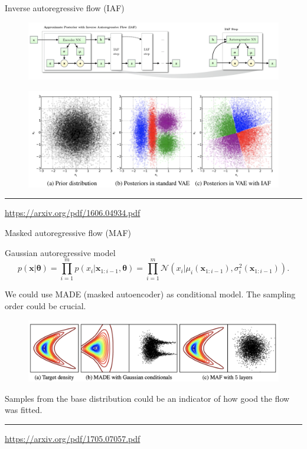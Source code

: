 \documentclass{beamer}
\newcommand{\bx}{\mathbf{x}}
\newcommand{\btheta}{\boldsymbol{\theta}}
\begin{document}
\begin{frame}{Inverse autoregressive flow (IAF)}
	\begin{figure}
		\includegraphics[width=\linewidth]{figs/iaf2.png}
	\end{figure}
	\begin{figure}
		\includegraphics[width=\linewidth]{figs/iaf1.png}
	\end{figure}
	\vfill
	\hrule\medskip
	{\scriptsize \href{https://arxiv.org/pdf/1606.04934.pdf}{https://arxiv.org/pdf/1606.04934.pdf}} 
\end{frame}
\begin{frame}{Masked autoregressive flow (MAF)}
	\begin{block}{Gaussian autoregressive model}
	\vspace{-0.5cm}
	\[
		p(\bx | \btheta) = \prod_{i=1}^m p(x_i | \bx_{1:i - 1}, \btheta) = \prod_{i=1}^m \mathcal{N} \left(x_i | \mu_i(\bx_{1:i-1}), \sigma^2_i (\bx_{1:i-1})\right).
	\]
	\vspace{-0.5cm}
	\end{block}
	We could use MADE (masked autoencoder) as conditional model. The sampling order could be crucial.
	\begin{figure}
		\includegraphics[width=\linewidth]{figs/maf1.png}
	\end{figure}
	Samples from the base distribution could be an indicator of how good the flow was fitted. \\
	\vfill
	\hrule\medskip
	{\scriptsize \href{https://arxiv.org/pdf/1705.07057.pdf}{https://arxiv.org/pdf/1705.07057.pdf}} 
\end{frame}
\end{document}
